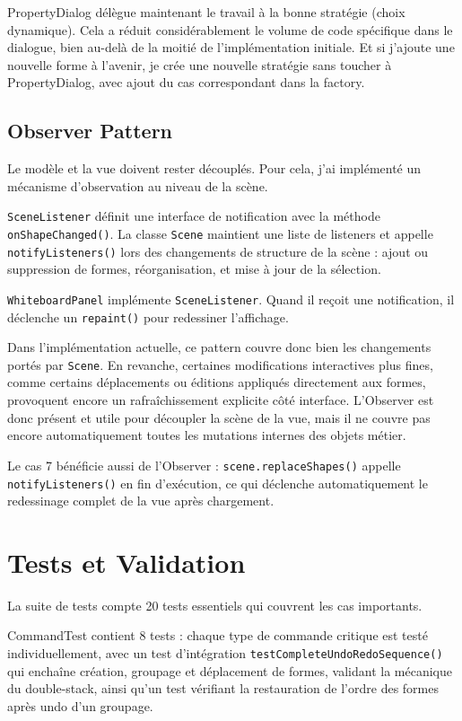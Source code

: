 \documentclass[11pt,a4paper,french]{article}
\begin{document}
PropertyDialog délègue maintenant le travail à la bonne stratégie (choix dynamique). Cela a réduit considérablement le volume de code spécifique dans le dialogue, bien au-delà de la moitié de l'implémentation initiale. Et si j'ajoute une nouvelle forme à l'avenir, je crée une nouvelle stratégie sans toucher à PropertyDialog, avec ajout du cas correspondant dans la factory.

\subsection{Observer Pattern}

Le modèle et la vue doivent rester découplés. Pour cela, j'ai implémenté un mécanisme d'observation au niveau de la scène.

\texttt{SceneListener} définit une interface de notification avec la méthode \texttt{onShapeChanged()}. La classe \texttt{Scene} maintient une liste de listeners et appelle \texttt{notifyListeners()} lors des changements de structure de la scène : ajout ou suppression de formes, réorganisation, et mise à jour de la sélection.

\texttt{WhiteboardPanel} implémente \texttt{SceneListener}. Quand il reçoit une notification, il déclenche un \texttt{repaint()} pour redessiner l'affichage.

Dans l'implémentation actuelle, ce pattern couvre donc bien les changements portés par \texttt{Scene}. En revanche, certaines modifications interactives plus fines, comme certains déplacements ou éditions appliqués directement aux formes, provoquent encore un rafraîchissement explicite côté interface. L'Observer est donc présent et utile pour découpler la scène de la vue, mais il ne couvre pas encore automatiquement toutes les mutations internes des objets métier.

Le cas 7 bénéficie aussi de l'Observer : \texttt{scene.replaceShapes()} appelle \texttt{notifyListeners()} en fin d'exécution, ce qui déclenche automatiquement le redessinage complet de la vue après chargement.

\section{Tests et Validation}

La suite de tests compte 20 tests essentiels qui couvrent les cas importants.

CommandTest contient 8 tests : chaque type de commande critique est testé individuellement, avec un test d'intégration \texttt{testCompleteUndoRedoSequence()} qui enchaîne création, groupage et déplacement de formes, validant la mécanique du double-stack, ainsi qu'un test vérifiant la restauration de l'ordre des formes après undo d'un groupage.
\end{document}
